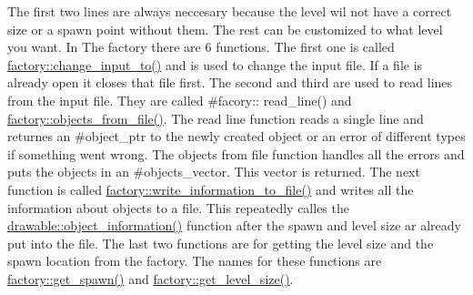 The first two lines are always neccesary because the level wil not have a correct size or a spawn point without them. The rest can be customized to what level you want. In The factory there are 6 functions. The first one is called \hyperlink{classfactory_a9e164a8fbb65188de99c39d55d7cc384}{factory\+::change\+\_\+input\+\_\+to()} and is used to change the input file. If a file is already open it closes that file first. The second and third are used to read lines from the input file. They are called \#facory\+:\+: read\+\_\+line() and \hyperlink{classfactory_afb2fad4ac9b0f39b1bfc3f3fc8d218b6}{factory\+::objects\+\_\+from\+\_\+file()}. The read line function reads a single line and returnes an \#object\+\_\+ptr to the newly created object or an error of different types if something went wrong. The objects from file function handles all the errors and puts the objects in an \#objects\+\_\+vector. This vector is returned. The next function is called \hyperlink{classfactory_af17f2a44d75cf8ccf712384341c2fcde}{factory\+::write\+\_\+information\+\_\+to\+\_\+file()} and writes all the information about objects to a file. This repeatedly calles the \hyperlink{classdrawable_a2ed0f8bb53f33477f7722efa7bb24583}{drawable\+::object\+\_\+information()} function after the spawn and level size ar already put into the file. The last two functions are for getting the level size and the spawn location from the factory. The names for these functions are \hyperlink{classfactory_a3c3a039b8f76a947267dbe659166550b}{factory\+::get\+\_\+spawn()} and \hyperlink{classfactory_af9bb026273b34fc032ca5ac73d457611}{factory\+::get\+\_\+level\+\_\+size()}. 